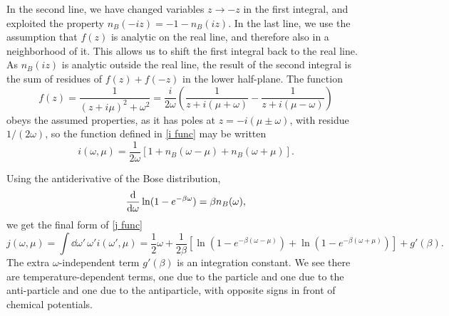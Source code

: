 In the second line, we have changed variables $z \rightarrow -z$ in the first integral, and exploited the property $n_B(-i z) = -1 - n_B(iz)$.
In the last line, we use the assumption that $f(z)$ is analytic on the real line, and therefore also in a neighborhood of it. 
This allows us to shift the first integral back to the real line.
As $n_B(iz)$ is analytic outside the real line, the result of the second integral is the sum of residues of $f(z) + f(-z)$ in the lower half-plane.
The function
%
\begin{equation}
    f(z) 
    = \frac{1}{(z + i \mu)^2 + \omega^2} 
    = \frac{i}{2 \omega } 
    \left(
        \frac{1}{z + i(\mu + \omega)} - \frac{1}{z + i(\mu - \omega)}
    \right)
\end{equation}
%
obeys the assumed properties, as it has poles at
$z = - i (\mu \pm \omega)$, with residue $1 /( 2 \omega)$, so the function defined in \autoref{i func} may be written
%
\begin{equation}
    i(\omega, \mu) 
    = \frac{1}{2\omega}
    [1 + n_B(\omega - \mu) + n_B(\omega + \mu)].
\end{equation}

Using the antiderivative of the Bose distribution,
%
\begin{equation}
    \odv{}{\omega} \ln(1 - e^{-\beta \omega}) = \beta n_B(\omega),
\end{equation}
%
we get the final form of \autoref{j func}
%
\begin{equation}
    j(\omega, \mu) = \int \dd \omega'\, \omega' i(\omega', \mu)
    =  
    \frac{1}{2}\omega + \frac{1}{2\beta} 
    \left[
        \ln\left(1 - e^{-\beta(\omega - \mu)}\right)
        + \ln\left(1 - e^{-\beta(\omega + \mu)}\right)
    \right]
    + g'(\beta).
\end{equation}
%
The extra $\omega$-independent term $g'(\beta)$ is an integration constant.
We see there are temperature-dependent terms, one due to the particle and one due to the anti-particle and one due to the antiparticle, with opposite signs in front of chemical potentials.

